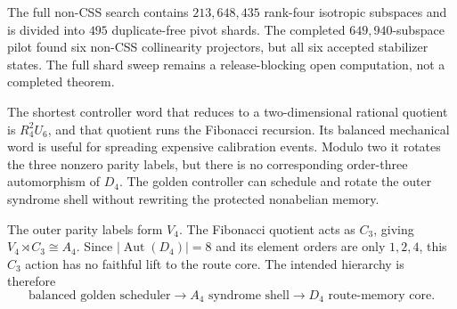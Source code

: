 \begin{spec}
The full non-CSS search contains $213{,}648{,}435$ rank-four isotropic subspaces
and is divided into $495$ duplicate-free pivot shards.  The completed
$649{,}940$-subspace pilot found six non-CSS collinearity projectors, but all six
accepted stabilizer states.  The full shard sweep remains a release-blocking
open computation, not a completed theorem.
\end{spec}

\begin{plain}
The shortest controller word that reduces to a two-dimensional rational quotient
is $R_4^2U_6$, and that quotient runs the Fibonacci recursion.  Its balanced
mechanical word is useful for spreading expensive calibration events.  Modulo
two it rotates the three nonzero parity labels, but there is no corresponding
order-three automorphism of $D_4$.  The golden controller can schedule and rotate
the outer syndrome shell without rewriting the protected nonabelian memory.
\end{plain}

\begin{spec}
The outer parity labels form $V_4$.  The Fibonacci quotient acts as $C_3$, giving
$V_4\rtimes C_3\cong A_4$.  Since $|\operatorname{Aut}(D_4)|=8$ and its element
orders are only $1,2,4$, this $C_3$ action has no faithful lift to the route core.
The intended hierarchy is therefore
\[
\text{balanced golden scheduler}\longrightarrow A_4\text{ syndrome shell}
\longrightarrow D_4\text{ route-memory core}.
\]
\end{spec}
